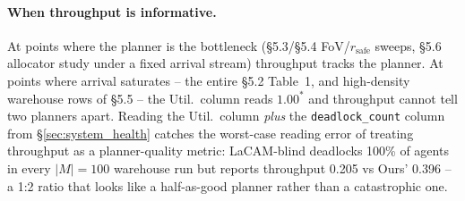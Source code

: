 \paragraph{When throughput is informative.}
At points where the planner is the bottleneck (\S5.3/\S5.4
FoV/$r_{\text{safe}}$ sweeps, \S5.6 allocator study under a fixed
arrival stream) throughput tracks the planner.  At points where
arrival saturates -- the entire §5.2 Table~1, and high-density
warehouse rows of \S5.5 -- the Util.\ column reads $1.00^{*}$ and
throughput cannot tell two planners apart.  Reading the Util.\
column \emph{plus} the \texttt{deadlock\_count} column from
\S\ref{sec:system_health} catches the worst-case reading error of
treating throughput as a planner-quality metric: LaCAM-blind
deadlocks 100\% of agents in every $|M|=100$ warehouse run but
reports throughput 0.205 vs Ours' 0.396 -- a 1:2 ratio that looks
like a half-as-good planner rather than a catastrophic one.

